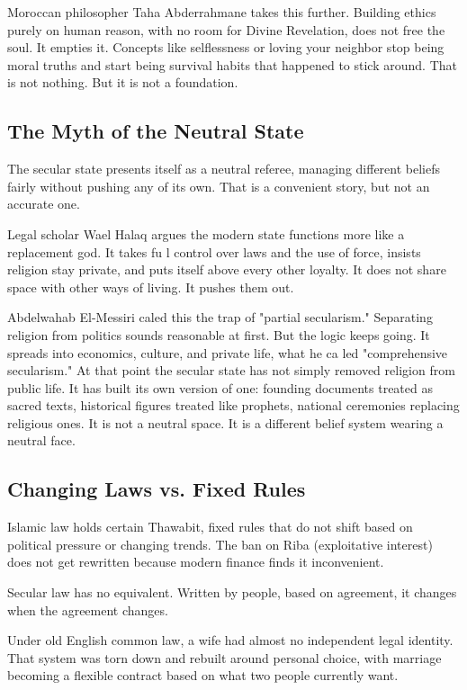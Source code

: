 \documentclass[12pt]{article}
\begin{document}
Moroccan philosopher Taha Abderrahmane takes this further. Building ethics purely on human 
reason, with no room for Divine Revelation, does not free the soul. It empties it. Concepts like 
selflessness or loving your neighbor stop being moral truths and start being survival habits that 
happened to stick around. That is not nothing. But it is not a foundation. 

\subsection*{The Myth of the Neutral State}

The secular state presents itself as a neutral referee, managing different beliefs fairly without 
pushing any of its own. That is a convenient story, but not an accurate one. 

Legal scholar Wael Halaq argues the modern state functions more like a replacement god. It 
takes fu l control over laws and the use of force, insists religion stay private, and puts itself 
above every other loyalty. It does not share space with other ways of living. It pushes them out. 

Abdelwahab El-Messiri caled this the trap of "partial secularism." Separating religion from 
politics sounds reasonable at first. But the logic keeps going. It spreads into economics, 
culture, and private life, what he ca led "comprehensive secularism." At that point the secular 
state has not simply removed religion from public life. It has built its own version of one: 
founding documents treated as sacred texts, historical figures treated like prophets, national 
ceremonies replacing religious ones. It is not a neutral space. It is a different belief system 
wearing a neutral face. 

\subsection*{Changing Laws vs. Fixed Rules}

Islamic law holds certain Thawabit, fixed rules that do not shift based on political pressure or 
changing trends. The ban on Riba (exploitative interest) does not get rewritten because 
modern finance finds it inconvenient. 

Secular law has no equivalent. Written by people, based on agreement, it changes when the 
agreement changes. 

Under old English common law, a wife had almost no independent legal identity. That system 
was torn down and rebuilt around personal choice, with marriage becoming a flexible contract 
based on what two people currently want. 
\end{document}
